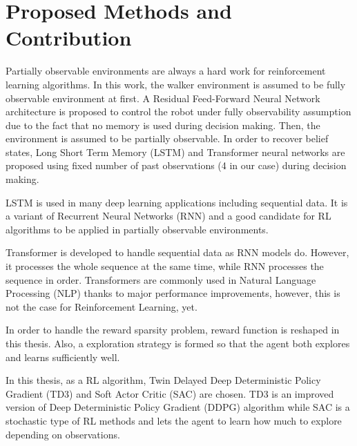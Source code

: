 \section{Proposed Methods and Contribution}
\label{sec:proposed_methods}

Partially observable environments are always a hard work for reinforcement learning algorithms. 
In this work, the walker environment is assumed to be fully observable environment at first. 
A Residual Feed-Forward Neural Network architecture is proposed to control 
the robot under fully observability assumption due to the fact that no memory is used during decision making. 
Then, the environment is assumed to be partially observable. 
In order to recover belief states, Long Short Term Memory (LSTM) and 
Transformer neural networks are proposed using fixed number of 
past observations (4 in our case) during decision making. 

LSTM is used in many deep learning applications including sequential data. 
It is a variant of Recurrent Neural Networks (RNN) and a good candidate for RL algorithms to be applied in partially observable environments. 

Transformer is developed to handle sequential data as RNN models do. 
However, it processes the whole sequence at the same time, while RNN processes the sequence in order. 
Transformers are commonly used in Natural Language Processing (NLP) thanks to major performance improvements, however, this is not the case for Reinforcement Learning, yet.

In order to handle the reward sparsity problem, reward function is reshaped in this thesis. Also, a exploration strategy is formed so that the agent both explores and learns sufficiently well. 

In this thesis, as a RL algorithm, Twin Delayed Deep Deterministic Policy Gradient (TD3) and Soft Actor Critic (SAC) are chosen. 
TD3 is an improved version of Deep Deterministic Policy Gradient (DDPG) algorithm while SAC is a stochastic type of RL methods and lets the agent to learn how much to explore depending on observations.
